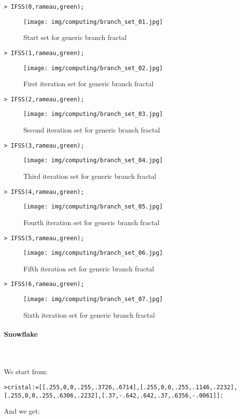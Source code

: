 	\texttt{> IFSS(0,rameau,green);}
	\begin{figure}[H]
		\centering
		\texttt{[image: img/computing/branch\_set\_01.jpg]}
		\caption[]{Start set for generic branch fractal}
	\end{figure}
	\texttt{> IFSS(1,rameau,green);}
	\begin{figure}[H]
		\centering
		\texttt{[image: img/computing/branch\_set\_02.jpg]}
		\caption[]{First iteration set for generic branch fractal}
	\end{figure}
	\texttt{> IFSS(2,rameau,green);}
	\begin{figure}[H]
		\centering
		\texttt{[image: img/computing/branch\_set\_03.jpg]}
		\caption[]{Second iteration set for generic branch fractal}
	\end{figure}
	\texttt{> IFSS(3,rameau,green);}
	\begin{figure}[H]
		\centering
		\texttt{[image: img/computing/branch\_set\_04.jpg]}
		\caption[]{Third iteration set for generic branch fractal}
	\end{figure}
	\texttt{> IFSS(4,rameau,green);}
	\begin{figure}[H]
		\centering
		\texttt{[image: img/computing/branch\_set\_05.jpg]}
		\caption[]{Fourth iteration set for generic branch fractal}
	\end{figure}
	\texttt{> IFSS(5,rameau,green);}
	\begin{figure}[H]
		\centering
		\texttt{[image: img/computing/branch\_set\_06.jpg]}
		\caption[]{Fifth iteration set for generic branch fractal}
	\end{figure}
	\texttt{> IFSS(6,rameau,green);}
	\begin{figure}[H]
		\centering
		\texttt{[image: img/computing/branch\_set\_07.jpg]}
		\caption[]{Sixth iteration set for generic branch fractal}
	\end{figure}
	
	\paragraph{Snowflake}\mbox{}\\\\
	We start from:
	
	\texttt{>cristal:=[[.255,0,0,.255,.3726,.6714],[.255,0,0,.255,.1146,.2232], }
	\texttt{[.255,0,0,.255,.6306,.2232],[.37,-.642,.642,.37,.6356,-.0061]]:}

	And we get:
	
